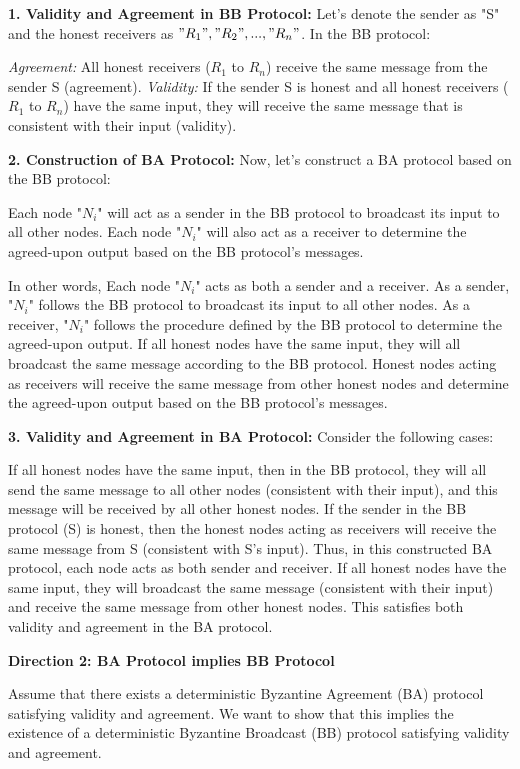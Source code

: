 \documentclass{article}
\begin{document}
\begin{enumerate}
\textbf{1. Validity and Agreement in BB Protocol:}
Let's denote the sender as "S" and the honest receivers as $"R_1", "R_2", ..., "R_n"$. In the BB protocol:

\emph{Agreement:} All honest receivers ($R_1$ to $R_n$) receive the same message from the sender S (agreement).
\emph{Validity:} If the sender S is honest and all honest receivers ($R_1$ to $R_n$) have the same input, they will receive the same message that is consistent with their input (validity).

\textbf{2. Construction of BA Protocol:}
Now, let's construct a BA protocol based on the BB protocol:

Each node "$N_i$" will act as a sender in the BB protocol to broadcast its input to all other nodes.
Each node "$N_i$" will also act as a receiver to determine the agreed-upon output based on the BB protocol's messages.

In other words, Each node "$N_i$" acts as both a sender and a receiver.
As a sender, "$N_i$" follows the BB protocol to broadcast its input to all other nodes.
As a receiver, "$N_i$" follows the procedure defined by the BB protocol to determine the agreed-upon output.
If all honest nodes have the same input, they will all broadcast the same message according to the BB protocol.
Honest nodes acting as receivers will receive the same message from other honest nodes and determine the agreed-upon output based on the BB protocol's messages.

\textbf{3. Validity and Agreement in BA Protocol:}
Consider the following cases:

If all honest nodes have the same input, then in the BB protocol, they will all send the same message to all other nodes (consistent with their input), and this message will be received by all other honest nodes.
If the sender in the BB protocol (S) is honest, then the honest nodes acting as receivers will receive the same message from S (consistent with S's input).
Thus, in this constructed BA protocol, each node acts as both sender and receiver. If all honest nodes have the same input, they will broadcast the same message (consistent with their input) and receive the same message from other honest nodes. This satisfies both validity and agreement in the BA protocol.

\textbf{Direction 2: BA Protocol implies BB Protocol}

Assume that there exists a deterministic Byzantine Agreement (BA) protocol satisfying validity and agreement. We want to show that this implies the existence of a deterministic Byzantine Broadcast (BB) protocol satisfying validity and agreement.


\end{enumerate}
\end{document}
